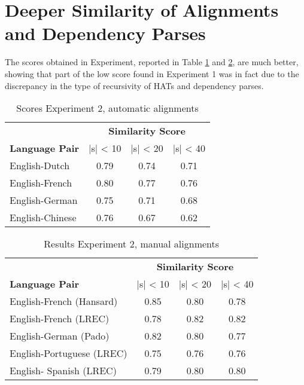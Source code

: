 \documentclass[hidelinks]{report}
\begin{document}


\section{Deeper Similarity of Alignments and Dependency Parses}

The scores obtained in Experiment, reported in Table \ref{tab:scores3} and \ref{tab:scores4}, are much better, showing that part of the low score found in Experiment 1 was in fact due to the discrepancy in the type of recursivity of HATs and dependency parses.


\begin{table}[!ht]
\begin{tabular}{|l|c|c|c|}
\hline
&\multicolumn{3}{c}{\textbf{Similarity Score}}\\
\textbf{Language Pair} & |s| < 10 & |s| < 20 & |s| < 40\\
\hline \hline
English-Dutch & 0.79 & 0.74 & 0.71 \\
\hline
English-French & 0.80 & 0.77 & 0.76\\
\hline
English-German & 0.75 & 0.71 & 0.68 \\
\hline
English-Chinese & 0.76 & 0.67 & 0.62\\
\hline
\end{tabular}
\caption{Scores Experiment 2, automatic alignments}\label{tab:scores3}
\end{table}

\begin{table}[!ht]
\begin{tabular}{|l|c|c|c|}
\hline
&\multicolumn{3}{c}{\textbf{Similarity Score}}\\
\textbf{Language Pair} & |s| < 10 & |s| < 20 & |s| < 40\\
\hline \hline
English-French (Hansard) & 0.85 & 0.80 & 0.78 \\
\hline
English-French (LREC) & 0.78 & 0.82 & 0.82 \\
\hline
English-German (Pado) & 0.82 & 0.80 & 0.77 \\
\hline
English-Portuguese (LREC) & 0.75 & 0.76 & 0.76 \\
\hline
English- Spanish (LREC) & 0.79 & 0.80 & 0.80\\
\hline
\end{tabular}
\caption{Results Experiment 2, manual alignments}\label{tab:scores4}
\end{table}
\end{document}
